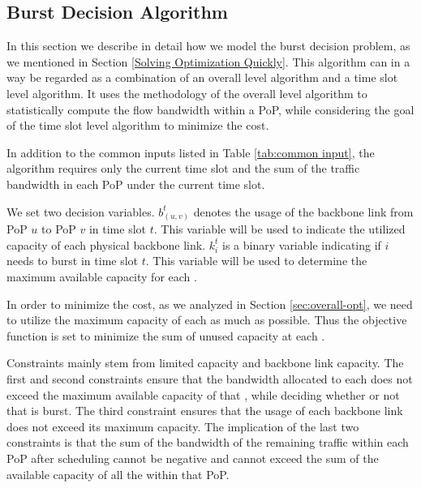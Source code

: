 \subsection{{\EGRESS} Burst Decision Algorithm}
In this section we describe in detail how we model the {\egress} burst decision problem, as we mentioned in Section \ref{Solving Optimization Quickly}. This algorithm can in a way be regarded as a combination of an overall level algorithm and a time slot level algorithm. It uses the methodology of the overall level algorithm to statistically compute the flow bandwidth within a PoP, while considering the goal of the time slot level algorithm to minimize the cost.

 In addition to the common inputs listed in Table \ref{tab:common input}, the algorithm requires only the current time slot and the sum of the traffic bandwidth in each PoP under the current time slot.


 We set two decision variables. $b^t_{(u,v)}$ denotes the usage of the backbone link from PoP $u$ to PoP $v$ in time slot $t$. This variable will be used to indicate the utilized capacity of each physical backbone link. $k_i^t$ is a binary variable indicating if {\egress} $i$ needs to burst in time slot $t$. This variable will be used to determine the maximum available capacity for each {\egress}.

 In order to minimize the cost, as we analyzed in Section \ref{sec:overall-opt}, we need to utilize the maximum capacity of each {\egress} as much as possible. Thus the objective function is set to minimize the sum of unused capacity at each {\egress}.

 Constraints mainly stem from limited {\egress} capacity and backbone link capacity. The first and second constraints ensure that the bandwidth allocated to each {\egress} does not exceed the maximum available capacity of that {\egress}, while deciding whether or not that {\egress} is burst. The third constraint ensures that the usage of each backbone link does not exceed its maximum capacity. The implication of the last two constraints is that the sum of the bandwidth of the remaining traffic within each PoP after scheduling cannot be negative and cannot exceed the sum of the available capacity of all the {\egresses} within that PoP.

